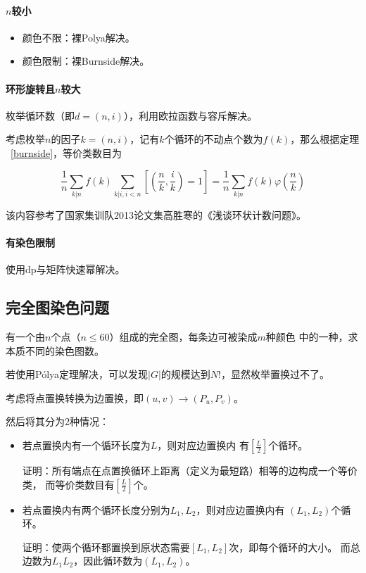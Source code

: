 \paragraph{$n$较小}
\begin{itemize}
	\item 颜色不限：裸Polya解决。
	\item 颜色限制：裸Burnside解决。
\end{itemize}
\paragraph{环形旋转且$n$较大}
枚举循环数（即$d=(n,i)$），利用欧拉函数与容斥解决。

考虑枚举$n$的因子$k=(n,i)$，记有$k$个循环的不动点个数为$f(k)$，那么根据定理
~\ref{burnside}，等价类数目为

\begin{displaymath}
	\frac{1}{n}\sum_{k|n}{f(k)\sum_{k|i,i<n}{[(\frac{n}{k},\frac{i}{k})=1]}}=
	\frac{1}{n}\sum_{k|n}{f(k)\varphi(\frac{n}{k})}
\end{displaymath}

该内容参考了国家集训队2013论文集高胜寒的《浅谈环状计数问题》。
\paragraph{有染色限制}
使用dp与矩阵快速幂解决。

\subsection{完全图染色问题}
有一个由$n$个点（$n\leq 60$）组成的完全图，每条边可被染成$m$种颜色
中的一种，求本质不同的染色图数。

若使用Pólya定理解决，可以发现$|G|$的规模达到$N!$，显然枚举置换过不了。

考虑将点置换转换为边置换，即$(u,v)\rightarrow (P_u,P_v)$。

然后将其分为2种情况：
\begin{itemize}
	\item 若点置换内有一个循环长度为$L$，则对应边置换内
	有$\left[\frac{L}{2}\right]$个循环。

	证明：所有端点在点置换循环上距离（定义为最短路）相等的边构成一个等价类，
	而等价类数目有$\left[\frac{L}{2}\right]$个。

	\item 若点置换内有两个循环长度分别为$L_1,L_2$，则对应边置换内有
	$(L_1,L_2)$个循环。

	证明：使两个循环都置换到原状态需要$[L_1,L_2]$次，即每个循环的大小。
	而总边数为$L_1L_2$，因此循环数为$(L_1,L_2)$。
\end{itemize}

